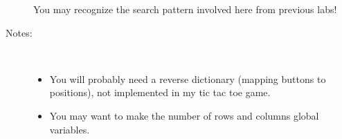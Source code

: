 \documentclass[12pt]{article}
\begin{document}
\begin{description}
You may recognize the search pattern involved here from previous labs!

\item[Notes:]~

\begin{itemize}
\item  You will probably need a reverse dictionary (mapping
buttons to positions), not implemented in my tic tac toe game.
\item You may want to make the number of rows and columns 
global variables.
\end{itemize}



\end{description}
\end{document}
